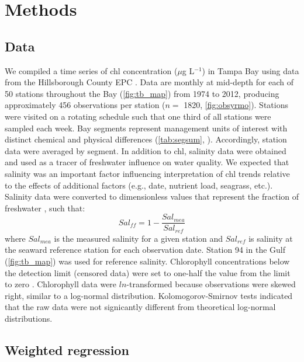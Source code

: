 \documentclass{svjour3}\usepackage[]{graphicx}\usepackage[]{color}
\newcommand{\mugl}{$\mu$g L$^{-1}$}
\begin{document}
\section{Methods}

\subsection{Data}

We compiled a time series of \ac{chl} concentration (\mugl) in Tampa Bay using data from the Hillsborough County \ac{EPC} \cite{TBEP11}.  Data are monthly at mid-depth for each of 50 stations throughout the Bay (\cref{fig:tb_map}) from 1974 to 2012, producing approximately 456 observations per station ($n=$ 1820, \cref{fig:obsyrmo}).  Stations were visited on a rotating schedule such that one third of all stations were sampled each week.  Bay segments represent management units of interest with distinct chemical and physical differences (\cref{tab:segsum}, \cite{Lewis85}).  Accordingly, station data were averaged by segment.  In addition to \ac{chl}, salinity data were obtained and used as a tracer of freshwater influence on water quality.  We expected that salinity was an important factor influencing interpretation of \ac{chl} trends relative to the effects of additional factors (e.g., date, nutrient load, seagrass, etc.).  Salinity data were converted to dimensionless values that represent the fraction of freshwater \cite{Dyer73}, such that:
\begin{equation}
Sal_{ff} = 1 - \frac{Sal_{mea}}{Sal_{ref}}
\end{equation}
\noindent where $Sal_{mea}$ is the measured salinity for a given station and $Sal_{ref}$ is salinity at the seaward reference station for each observation date.  Station 94 in the Gulf (\cref{fig:tb_map}) was used for reference salinity.  Chlorophyll concentrations below the detection limit (censored data) were set to one-half the value from the limit to zero \cite{Gilbert87}.  Chlorophyll data were $ln$-transformed because observations were skewed right, similar to a log-normal distribution.  Kolomogorov-Smirnov tests indicated that the raw data were not signicantly different from theoretical log-normal distributions.

\subsection{Weighted regression}
\end{document}
